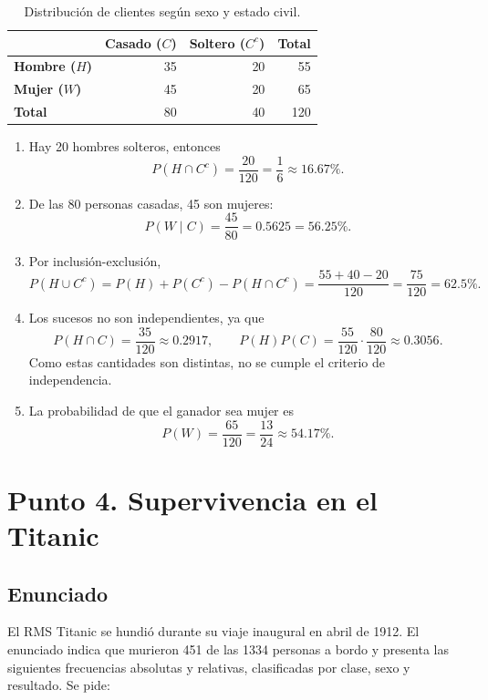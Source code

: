 \documentclass[12pt]{article}
\begin{document}
\begin{table}[H]
\centering
\small
\renewcommand{\arraystretch}{1.15}
\begin{tabular}{|l|r|r|r|}
\hline
 & \textbf{Casado ($C$)} & \textbf{Soltero ($C^c$)} & \textbf{Total} \\ \hline
\textbf{Hombre ($H$)} & 35 & 20 & 55 \\ \hline
\textbf{Mujer ($W$)} & 45 & 20 & 65 \\ \hline
\textbf{Total} & 80 & 40 & 120 \\ \hline
\end{tabular}
\caption{Distribución de clientes según sexo y estado civil.}
\label{tab:clientes-estado-civil}
\end{table}

\begin{enumerate}
    \item Hay 20 hombres solteros, entonces
    \[
    P(H\cap C^c)=\frac{20}{120}=\frac{1}{6}\approx16.67\%.
    \]
    \item De las 80 personas casadas, 45 son mujeres:
    \[
    P(W\mid C)=\frac{45}{80}=0.5625=56.25\%.
    \]
    \item Por inclusión-exclusión,
    \[
    P(H\cup C^c)=P(H)+P(C^c)-P(H\cap C^c)
    =\frac{55+40-20}{120}=\frac{75}{120}=62.5\%.
    \]
    \item Los sucesos no son independientes, ya que
    \[
    P(H\cap C)=\frac{35}{120}\approx0.2917,
    \qquad
    P(H)P(C)=\frac{55}{120}\cdot\frac{80}{120}\approx0.3056.
    \]
    Como estas cantidades son distintas, no se cumple el criterio de independencia.
    \item La probabilidad de que el ganador sea mujer es
    \[
    P(W)=\frac{65}{120}=\frac{13}{24}\approx54.17\%.
    \]
\end{enumerate}

\section*{Punto 4. Supervivencia en el Titanic}

\subsection*{Enunciado}

El RMS Titanic se hundió durante su viaje inaugural en abril de 1912. El enunciado indica que murieron 451 de las 1334 personas a bordo y presenta las siguientes frecuencias absolutas y relativas, clasificadas por clase, sexo y resultado. Se pide:
\end{document}
